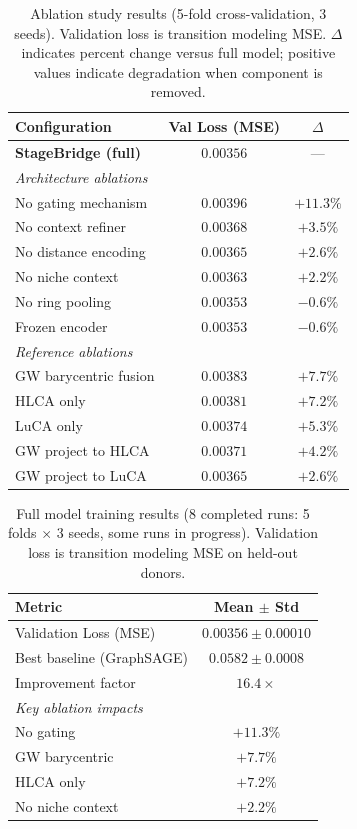 \documentclass[conference]{IEEEtran}
\begin{document}
\begin{table}[h]
\caption{Ablation study results (5-fold cross-validation, 3 seeds). Validation loss is transition modeling MSE. $\Delta$ indicates percent change versus full model; positive values indicate degradation when component is removed.}
\label{tab:ablation_results}
\centering
\begin{tabular}{lcc}
\toprule
Configuration & Val Loss (MSE) & $\Delta$ \\
\midrule
\textbf{StageBridge (full)} & $\mathbf{0.00356}$ & --- \\
\midrule
\multicolumn{3}{l}{\textit{Architecture ablations}} \\
No gating mechanism & $0.00396$ & $+11.3\%$ \\
No context refiner & $0.00368$ & $+3.5\%$ \\
No distance encoding & $0.00365$ & $+2.6\%$ \\
No niche context & $0.00363$ & $+2.2\%$ \\
No ring pooling & $0.00353$ & $-0.6\%$ \\
Frozen encoder & $0.00353$ & $-0.6\%$ \\
\midrule
\multicolumn{3}{l}{\textit{Reference ablations}} \\
GW barycentric fusion & $0.00383$ & $+7.7\%$ \\
HLCA only & $0.00381$ & $+7.2\%$ \\
LuCA only & $0.00374$ & $+5.3\%$ \\
GW project to HLCA & $0.00371$ & $+4.2\%$ \\
GW project to LuCA & $0.00365$ & $+2.6\%$ \\
\bottomrule
\end{tabular}
\end{table}

\begin{table}[h]
\caption{Full model training results (8 completed runs: 5 folds $\times$ 3 seeds, some runs in progress). Validation loss is transition modeling MSE on held-out donors.}
\label{tab:results}
\centering
\begin{tabular}{lc}
\toprule
Metric & Mean $\pm$ Std \\
\midrule
Validation Loss (MSE) & $0.00356 \pm 0.00010$ \\
Best baseline (GraphSAGE) & $0.0582 \pm 0.0008$ \\
Improvement factor & $16.4\times$ \\
\midrule
\multicolumn{2}{l}{\textit{Key ablation impacts}} \\
No gating & $+11.3\%$ \\
GW barycentric & $+7.7\%$ \\
HLCA only & $+7.2\%$ \\
No niche context & $+2.2\%$ \\
\bottomrule
\end{tabular}
\end{table}
\end{document}
